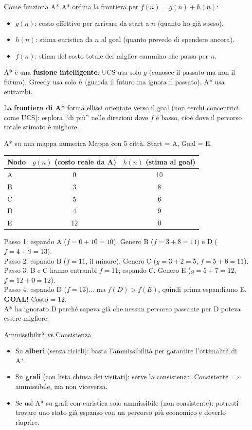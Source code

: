 \documentclass[12pt,a4paper]{article}
\begin{document}
\begin{narrativo}{Come funziona A*}
A* ordina la frontiera per $f(n) = g(n) + h(n)$:
\begin{itemize}[noitemsep]
  \item $g(n)$: costo effettivo per arrivare da start a $n$ (quanto ho già speso).
  \item $h(n)$: stima euristica da $n$ al goal (quanto prevedo di spendere ancora).
  \item $f(n)$: stima del costo totale del miglior cammino che passa per $n$.
\end{itemize}
A* è una \textbf{fusione intelligente}: UCS usa solo $g$ (conosce il passato ma non il futuro), Greedy usa solo $h$ (guarda il futuro ma ignora il passato). A* usa entrambi.

La \textbf{frontiera di A*} forma ellissi orientate verso il goal (non cerchi concentrici come UCS): esplora ``di più'' nelle direzioni dove $f$ è basso, cioè dove il percorso totale stimato è migliore.
\end{narrativo}

\begin{esempio}{A* su una mappa numerica}
Mappa con 5 città. Start = A, Goal = E.
\begin{center}
\begin{tabular}{lcc}
\toprule
Nodo & $g(n)$ (costo reale da A) & $h(n)$ (stima al goal) \\
\midrule
A & 0 & 10 \\
B & 3 & 8 \\
C & 5 & 6 \\
D & 4 & 9 \\
E & 12 & 0 \\
\bottomrule
\end{tabular}
\end{center}
Passo 1: espando A ($f=0+10=10$). Genero B ($f=3+8=11$) e D ($f=4+9=13$).\\
Passo 2: espando B ($f=11$, il minore). Genero C ($g=3+2=5$, $f=5+6=11$).\\
Passo 3: B e C hanno entrambi $f=11$; espando C. Genero E ($g=5+7=12$, $f=12+0=12$).\\
Passo 4: espando D ($f=13$)... ma $f(D)>f(E)$, quindi prima espandiamo E. \textbf{GOAL!} Costo = 12.\\
A* ha ignorato D perché sapeva già che nessun percorso passante per D poteva essere migliore.
\end{esempio}

\begin{attenzione}{Ammissibilità vs Consistenza}
\begin{itemize}[noitemsep]
  \item Su \textbf{alberi} (senza ricicli): basta l'ammissibilità per garantire l'ottimalità di A*.
  \item Su \textbf{grafi} (con lista chiusa dei visitati): serve la consistenza. Consistente $\Rightarrow$ ammissibile, ma non viceversa.
  \item Se usi A* su grafi con euristica solo ammissibile (non consistente): potresti trovare uno stato già espanso con un percorso più economico e doverlo riaprire.
\end{itemize}
\end{attenzione}
\end{document}
